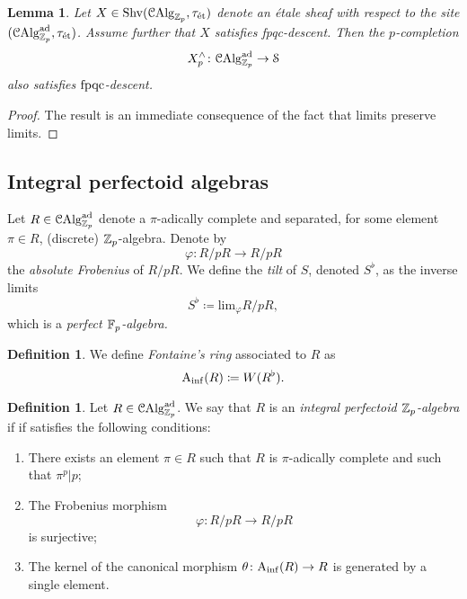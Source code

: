 \documentclass[10pt,a4paper]{amsart}
\numberwithin{equation}{subsection}
\newtheorem{lemma}[theorem]{Lemma}
\theoremstyle{definition}
\newtheorem{definition}[theorem]{Definition}
\def\lim{\mathrm{lim}}
\begin{document}
\begin{lemma}
    Let $X \in \mathrm{Shv}(\mathcal{C}\mathrm{Alg}_{\mathbb Z_p}, \tau_{\text{\'et}})$ denote an \'etale sheaf with respect to the site $(\mathcal C \mathrm{Alg}^{\mathrm{ad}}_{\mathbb Z_p}, \tau_{\text{\'et}})$. Assume further that $X$ satisfies \emph{fpqc}-descent. Then the $p$-completion
        \[
                X^\wedge_p \colon \mathcal C \mathrm{Alg}^{\mathrm{ad}}_{\mathbb Z_p} \to \mathcal S  
        \]
    also satisfies $\mathrm{fpqc}$-descent.
\end{lemma}

\begin{proof}
    The result is an immediate consequence of the fact that limits preserve limits. 
\end{proof}

\subsection{Integral perfectoid algebras}

Let $R \in \mathcal C \mathrm{Alg}^{\mathrm{ad}}_{\mathbb Z_p}$ denote a $\pi$-adically complete and separated, for some element $\pi \in R$, (discrete) $\mathbb Z_p$-algebra. Denote by
    \[
        \varphi \colon R/ pR \to R/p  R
    \]
the \emph{absolute Frobenius} of $R/pR$. We define the \emph{tilt} of $S$, denoted $S^\flat$, as the inverse limits
    \[
        S^\flat \coloneqq \lim_{\varphi} R/ pR, 
    \]
which is a \emph{perfect $\mathbb F_p$-algebra.}

\begin{definition}
    We define \emph{Fontaine's ring} associated to $R$ as
        \[
                \mathrm{A}_{\mathrm{inf}}(R) \coloneqq W(R^\flat).
        \]
\end{definition}


\begin{definition}
Let $R \in \mathcal C \mathrm{Alg}^{\mathrm{ad}}_{\mathbb Z_p}$. We say that $R$ is an \emph{integral perfectoid $\mathbb Z_p$-algebra} if if satisfies the following conditions:
    \begin{enumerate}
            \item There exists an element $\pi \in R$ such that $R$ is $\pi$-adically complete and such that $\pi^p \vert p$;
            \item The Frobenius morphism    
                        \[
                                \varphi \colon R/p R \to R/ pR
                        \]  
                  is surjective;
            \item The kernel of the canonical morphism $\theta \colon \mathrm{A}_{\mathrm{inf}}(R) \to R$ is generated by a single element.
    \end{enumerate}
\end{definition}
\end{document}
